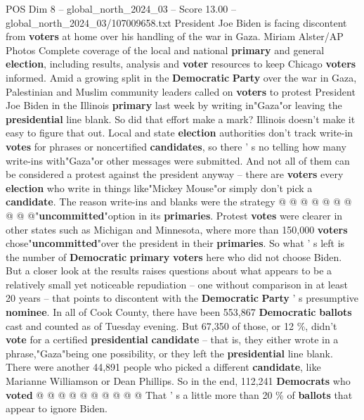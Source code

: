 \begin{textsample}{POS Dim 8 – global\_north\_2024\_03 – Score 13.00 – global\_north\_2024\_03/107009658.txt}  \label{ex:f8_pos_006}
President Joe Biden is facing discontent from \textbf{voters} at home over his handling of the war in Gaza.
Miriam Alster/AP Photos Complete coverage of the local and national \textbf{primary} and general \textbf{election}, including results, analysis and \textbf{voter} resources to keep Chicago \textbf{voters} informed.
Amid a growing split in the \textbf{Democratic} \textbf{Party} over the war in Gaza, Palestinian and Muslim community leaders called on \textbf{voters} to protest President Joe Biden in the Illinois \textbf{primary} last week by writing in"Gaza"or leaving the \textbf{presidential} line blank.
So did that effort make a mark?
Illinois doesn't make it easy to figure that out.
Local and state \textbf{election} authorities don't track write-in \textbf{votes} for phrases or noncertified \textbf{candidates}, so there ' s no telling how many write-ins with"Gaza"or other messages were submitted.
And not all of them can be considered a protest against the president anyway -- there are \textbf{voters} every \textbf{election} who write in things like"Mickey Mouse"or simply don't pick a \textbf{candidate}.
The reason write-ins and blanks were the strategy @ @ @ @ @ @ @ @ @ @"\textbf{uncommitted}"option in its \textbf{primaries}.
Protest \textbf{votes} were clearer in other states such as Michigan and Minnesota, where more than 150,000 \textbf{voters} chose"\textbf{uncommitted}"over the president in their \textbf{primaries}.
So what ' s left is the number of \textbf{Democratic} \textbf{primary} \textbf{voters} here who did not choose Biden.
But a closer look at the results raises questions about what appears to be a relatively small yet noticeable repudiation -- one without comparison in at least 20 years -- that points to discontent with the \textbf{Democratic} \textbf{Party} ' s presumptive \textbf{nominee}.
In all of Cook County, there have been 553,867 \textbf{Democratic} \textbf{ballots} cast and counted as of Tuesday evening.
But 67,350 of those, or 12 \%, didn't \textbf{vote} for a certified \textbf{presidential} \textbf{candidate} -- that is, they either wrote in a phrase,"Gaza"being one possibility, or they left the \textbf{presidential} line blank.
There were another 44,891 people who picked a different \textbf{candidate}, like Marianne Williamson or Dean Phillips.
So in the end, 112,241 \textbf{Democrats} who \textbf{voted} @ @ @ @ @ @ @ @ @ @ That ' s a little more than 20 \% of \textbf{ballots} that appear to ignore Biden.

\end{textsample}

